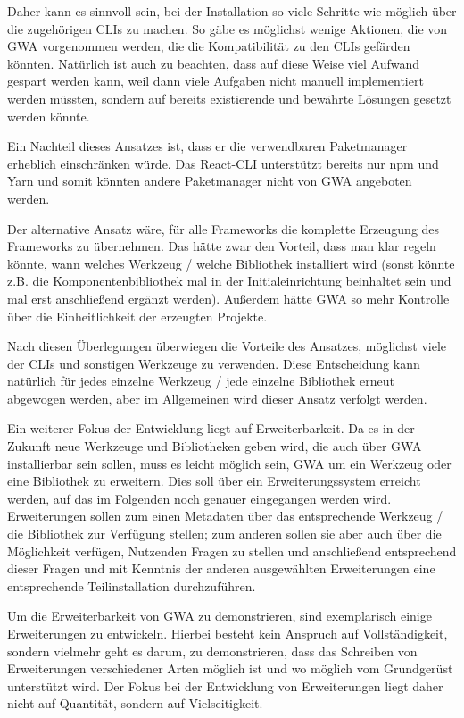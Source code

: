 \label{decision_use_clis}
Daher kann es sinnvoll sein, bei der Installation so viele Schritte wie möglich über die zugehörigen \gls{CLI}s zu machen. So gäbe es möglichst wenige Aktionen, die von \gls{GWA} vorgenommen werden, die die Kompatibilität zu den \gls{CLI}s gefärden könnten. Natürlich ist auch zu beachten, dass auf diese Weise viel Aufwand gespart werden kann, weil dann viele Aufgaben nicht manuell implementiert werden müssten, sondern auf bereits existierende und bewährte Lösungen gesetzt werden könnte.

Ein Nachteil dieses Ansatzes ist, dass er die verwendbaren Paketmanager erheblich einschränken würde. Das React-\gls{CLI} unterstützt bereits nur \gls{npm} und Yarn \cite{cra_package_managers} und somit könnten andere Paketmanager nicht von \gls{GWA} angeboten werden.

Der alternative Ansatz wäre, für alle Frameworks die komplette Erzeugung des Frameworks zu übernehmen. Das hätte zwar den Vorteil, dass man klar regeln könnte, wann welches Werkzeug / welche Bibliothek installiert wird (sonst könnte z.B. die Komponentenbibliothek mal in der Initialeinrichtung beinhaltet sein und mal erst anschließend ergänzt werden). Außerdem hätte \gls{GWA} so mehr Kontrolle über die Einheitlichkeit der erzeugten Projekte.

Nach diesen Überlegungen überwiegen die Vorteile des Ansatzes, möglichst viele der \gls{CLI}s und sonstigen Werkzeuge zu verwenden. Diese Entscheidung kann natürlich für jedes einzelne Werkzeug / jede einzelne Bibliothek erneut abgewogen werden, aber im Allgemeinen wird dieser Ansatz verfolgt werden.

Ein weiterer Fokus der Entwicklung liegt auf Erweiterbarkeit. Da es in der Zukunft neue Werkzeuge und Bibliotheken geben wird, die auch über \gls{GWA} installierbar sein sollen, muss es leicht möglich sein, \gls{GWA} um ein Werkzeug oder eine Bibliothek zu erweitern. Dies soll über ein Erweiterungssystem erreicht werden, auf das im Folgenden noch genauer eingegangen werden wird. Erweiterungen sollen zum einen Metadaten über das entsprechende Werkzeug / die Bibliothek zur Verfügung stellen; zum anderen sollen sie aber auch über die Möglichkeit verfügen, Nutzenden Fragen zu stellen und anschließend entsprechend dieser Fragen und mit Kenntnis der anderen ausgewählten Erweiterungen eine entsprechende Teilinstallation durchzuführen.

Um die Erweiterbarkeit von \gls{GWA} zu demonstrieren, sind exemplarisch einige Erweiterungen zu entwickeln. Hierbei besteht kein Anspruch auf Vollständigkeit, sondern vielmehr geht es darum, zu demonstrieren, dass das Schreiben von Erweiterungen verschiedener Arten möglich ist und wo möglich vom Grundgerüst unterstützt wird. Der Fokus bei der Entwicklung von Erweiterungen liegt daher nicht auf Quantität, sondern auf Vielseitigkeit.

